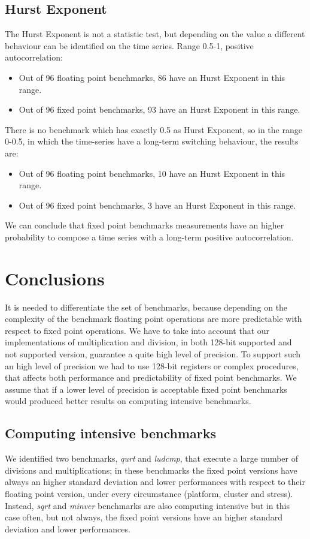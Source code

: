 \subsection{Hurst Exponent}
The Hurst Exponent is not a statistic test, but depending on the value a different behaviour can be identified on the time series.\newline
Range 0.5-1, positive autocorrelation:
\begin{itemize}
	\item Out of 96 floating point benchmarks, 86 have an Hurst Exponent in this range.
	\item Out of 96 fixed point benchmarks, 93 have an Hurst Exponent in this range.
\end{itemize}
There is no benchmark which has exactly 0.5 as Hurst Exponent, so in the range 0-0.5, in which the time-series have a long-term switching behaviour, the results are:
\begin{itemize}
	\item Out of 96 floating point benchmarks, 10 have an Hurst Exponent in this range.
	\item Out of 96 fixed point benchmarks, 3 have an Hurst Exponent in this range.
\end{itemize}
We can conclude that fixed point benchmarks measurements have an higher probability to compose a time series with a long-term positive autocorrelation.
\clearpage
\section{Conclusions}
It is needed to differentiate the set of benchmarks, because depending on the complexity of the benchmark floating point operations are more predictable with respect to fixed point operations.\newline
We have to take into account that our implementations of multiplication and division, in both 128-bit supported and not supported version, guarantee a quite high level of precision.
To support such an high level of precision we had to use 128-bit registers or complex procedures, that affects both performance and predictability of fixed point benchmarks. We assume that if a lower level of precision is acceptable fixed point benchmarks would produced better results on computing intensive benchmarks.
 
\subsection{Computing intensive benchmarks}
We identified two benchmarks, \textit{qurt} and \textit{ludcmp}, that execute a large number of divisions and multiplications; in these benchmarks the fixed point versions have always an higher standard deviation and lower performances with respect to their floating point version, under every circumstance (platform, cluster and stress).
Instead, \textit{sqrt} and \textit{minver} benchmarks are also computing intensive but in this case often, but not always, the fixed point versions have an higher standard deviation and lower performances.

